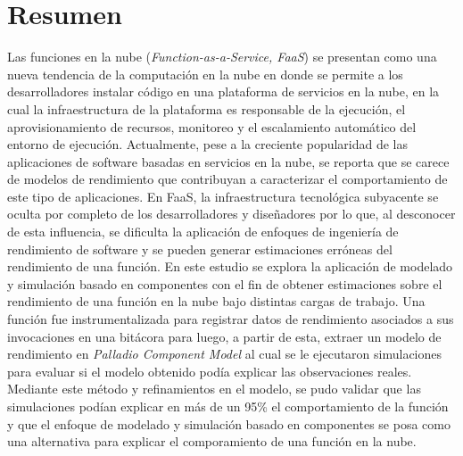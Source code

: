 \section*{Resumen}
Las funciones en la nube (\emph{Function-as-a-Service, FaaS}) se presentan como una nueva tendencia de la computación en la nube en donde se permite a los desarrolladores instalar código en una plataforma de servicios en la nube, en la cual la infraestructura de la plataforma es responsable de la ejecución, el aprovisionamiento de recursos, monitoreo y el escalamiento automático del entorno de ejecución. Actualmente, pese a la creciente popularidad de las aplicaciones de software basadas en servicios en la nube, se reporta que se carece de modelos de rendimiento que contribuyan a caracterizar el comportamiento de este tipo de aplicaciones. En FaaS, la infraestructura tecnológica subyacente se oculta por completo de los desarrolladores y diseñadores por lo que, al desconocer de esta influencia, se dificulta la aplicación de enfoques de ingeniería de rendimiento de software y se pueden generar estimaciones erróneas del rendimiento de una función. En este estudio se explora la aplicación de modelado y simulación basado en componentes con el fin de obtener estimaciones sobre el rendimiento de una función en la nube bajo distintas cargas de trabajo. Una función fue instrumentalizada para registrar datos de rendimiento asociados a sus invocaciones en una bitácora para luego, a partir de esta, extraer un modelo de rendimiento en \emph{Palladio Component Model} al cual se le ejecutaron simulaciones para evaluar si el modelo obtenido podía explicar las observaciones reales. Mediante este método y refinamientos en el modelo, se pudo validar que las simulaciones podían explicar en más de un 95\% el comportamiento de la función y que el enfoque de modelado y simulación basado en componentes se posa como una alternativa para explicar el comporamiento de una función en la nube. 

\newpage